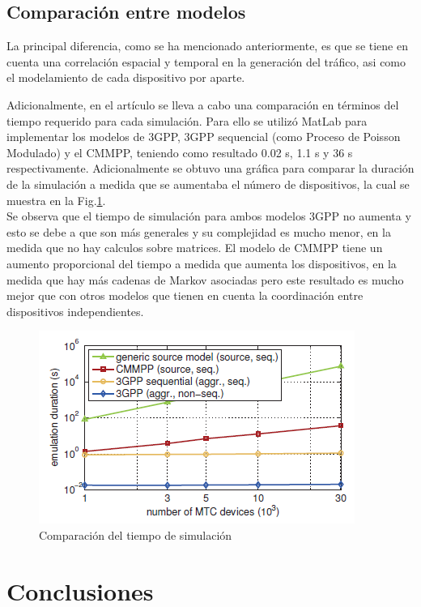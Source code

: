 \documentclass[journal]{IEEEtran}
\begin{document}
\subsection{Comparaci\'on entre modelos}
La principal diferencia, como se ha mencionado anteriormente, es que se tiene en cuenta una correlaci\'on espacial y temporal en la generaci\'on del tr\'afico, asi como el modelamiento de cada dispositivo por aparte.

Adicionalmente, en el art\'iculo se lleva a cabo una comparaci\'on en t\'erminos del tiempo requerido para cada simulaci\'on. Para ello se utiliz\'o MatLab para implementar los modelos de 3GPP, 3GPP sequencial (como Proceso de Poisson Modulado) y el CMMPP, teniendo como resultado 0.02 s, 1.1 s y 36 s respectivamente. Adicionalmente se obtuvo una gr\'afica para comparar la duraci\'on de la simulaci\'on a medida que se aumentaba el n\'umero de dispositivos, la cual se muestra en la Fig.\ref{comp}.\\

Se observa que el tiempo de simulaci\'on para ambos modelos 3GPP no aumenta y esto se debe a que son m\'as generales y su complejidad es mucho menor, en la medida que no hay calculos sobre matrices. El modelo de CMMPP tiene un aumento proporcional del tiempo a medida que aumenta los dispositivos, en la medida que hay m\'as cadenas de Markov asociadas pero este resultado es mucho mejor que con otros modelos que tienen en cuenta la coordinaci\'on entre dispositivos independientes.

\begin{figure}[h]
\centering
\includegraphics[scale=0.85]{graf5}
\caption{Comparaci\'on del tiempo de simulaci\'on}
\label{comp}
\end{figure}

\section{Conclusiones}
\end{document}
